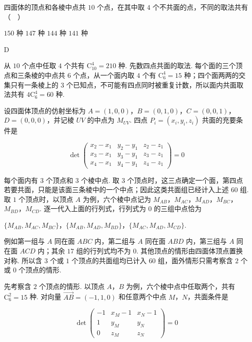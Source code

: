 \documentclass[UTF8,a4paper,oneside,11pt]{ctexbook}
\begin{document}
\begin{problem}
四面体的顶点和各棱中点共 \(10\) 个点，在其中取 \(4\) 个不共面的点，不同的取法共有（\(\quad\)）

\choices
    {\(150\) 种}
    {\(147\) 种}
    {\(144\) 种}
    {\(141\) 种}
\end{problem}

\begin{answer}
D
\end{answer}

\begin{solution}
从 \(10\) 个点中任取 \(4\) 个共有 \(\mathrm C_{10}^{4}=210\) 种. 先数四点共面的取法. 每个面的三个顶点和三条棱的中点共 \(6\) 个点，从一个面内取 \(4\) 个有 \(\mathrm C_{6}^{4}=15\) 种；四个面两两的交集只有一条棱上的 \(3\) 个已知点，不可能有四点同时被重复计数，所以面内共面取法共有 \(4\mathrm C_{6}^{4}=60\) 种.

设四面体顶点的仿射坐标为 \(A=(1,0,0)\)，\(B=(0,1,0)\)，\(C=(0,0,1)\)，\(D=(0,0,0)\)，并记棱 \(UV\) 的中点为 \(M_{UV}\). 四点 \(P_i=(x_i,y_i,z_i)\) 共面的充要条件是

\[
\det\begin{pmatrix}
x_2-x_1&y_2-y_1&z_2-z_1\\
x_3-x_1&y_3-y_1&z_3-z_1\\
x_4-x_1&y_4-y_1&z_4-z_1
\end{pmatrix}=0
\]

每个面内有 \(3\) 个顶点和 \(3\) 个棱中点. 取 \(3\) 个顶点时，这三点确定一个面，第四点若要共面，只能是该面三条棱中的一个中点；因此这类共面组已经计入上述 \(60\) 组. 取 \(1\) 个顶点时，以顶点 \(A\) 为例，六个棱中点记为 \(M_{AB}\)，\(M_{AC}\)，\(M_{AD}\)，\(M_{BC}\)，\(M_{BD}\)，\(M_{CD}\). 逐一代入上面的行列式，行列式为 \(0\) 的三组中点恰为

\(\{M_{AB},M_{AC},M_{BC}\}\)，\(\{M_{AB},M_{AD},M_{BD}\}\)，\(\{M_{AC},M_{AD},M_{CD}\}\).

例如第一组与 \(A\) 同在面 \(ABC\) 内，第二组与 \(A\) 同在面 \(ABD\) 内，第三组与 \(A\) 同在面 \(ACD\) 内；其余 \(17\) 组的行列式均不为 \(0\). 其他顶点的情形由四面体顶点置换对称. 所以含 \(3\) 个或 \(1\) 个顶点的共面组均已计入 \(60\) 组，面外情形只需考察含 \(2\) 个或 \(0\) 个顶点的情形.

先考察含 \(2\) 个顶点的情形. 以顶点 \(A\)，\(B\) 为例，六个棱中点中任取两个，共有 \(\mathrm C_6^2=15\) 种. 对向量 \(\overrightarrow{AB}=(-1,1,0)\) 和任意两个中点 \(M\)，\(N\)，共面条件是

\[
\det\begin{pmatrix}
-1&x_M-1&x_N-1\\
1&y_M&y_N\\
0&z_M&z_N
\end{pmatrix}=0
\]


\end{solution}
\end{document}

